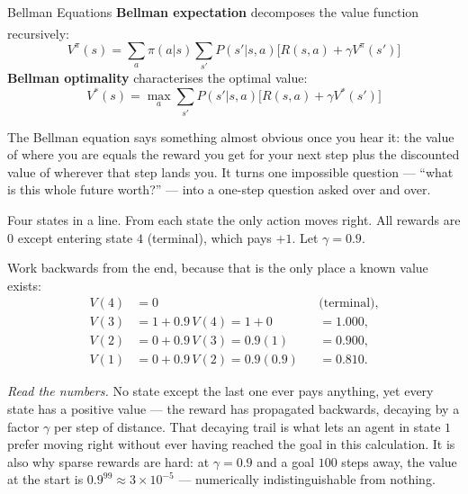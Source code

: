 \begin{v3topic}{Bellman Equations}
        \textbf{Bellman expectation} decomposes the value function
        recursively:\textsuperscript{\cite[][p.~145]{barberBayesianReasoningMachine2012}}
        \begin{equation}
            V^{\pi}(s) = \sum_a \pi(a|s) \sum_{s'} P(s'|s,a)
                         \bigl[R(s,a) + \gamma V^{\pi}(s')\bigr]
        \end{equation}
        \textbf{Bellman optimality} characterises the optimal value:
        \begin{equation}
            V^*(s) = \max_a \sum_{s'} P(s'|s,a)
                     \bigl[R(s,a) + \gamma V^*(s')\bigr]
            \label{eq:rl-bellman-optimality}
        \end{equation}

\begin{plainlanguage}
The Bellman equation says something almost obvious once you hear it: the value
of where you are equals the reward you get for your next step plus the
discounted value of wherever that step lands you. It turns one impossible
question --- ``what is this whole future worth?'' --- into a one-step question
asked over and over.
\end{plainlanguage}

\begin{workedexample}
Four states in a line. From each state the only action moves right. All rewards
are $0$ except entering state $4$ (terminal), which pays $+1$. Let
$\gamma = 0.9$.

Work backwards from the end, because that is the only place a known value
exists:
\[
\begin{aligned}
  V(4) &= 0 &&\text{(terminal)},\\
  V(3) &= 1 + 0.9\,V(4) = 1 + 0 &&= 1.000,\\
  V(2) &= 0 + 0.9\,V(3) = 0.9(1) &&= 0.900,\\
  V(1) &= 0 + 0.9\,V(2) = 0.9(0.9) &&= 0.810 .
\end{aligned}
\]

\emph{Read the numbers.} No state except the last one ever pays anything, yet
every state has a positive value --- the reward has propagated backwards,
decaying by a factor $\gamma$ per step of distance. That decaying trail is what
lets an agent in state $1$ prefer moving right without ever having reached the
goal in this calculation. It is also why sparse rewards are hard: at
$\gamma = 0.9$ and a goal $100$ steps away, the value at the start is
$0.9^{99} \approx 3\times10^{-5}$ --- numerically indistinguishable from
nothing.
\end{workedexample}


\end{v3topic}
